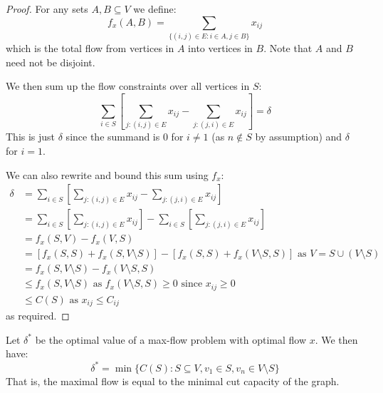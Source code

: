 \documentclass[../main.tex]{subfiles}
\begin{document}
\begin{proof}
  For any sets $A, B \subseteq V$ we define:
  \[
    f_x(A, B) = \sum_{\{(i, j) \in E: i \in A, j \in B\}} x_{i j}
  \]
  which is the total flow from vertices in $A$ into vertices in $B$.
  Note that $A$ and $B$ need not be disjoint.

  We then sum up the flow constraints over all vertices in $S$:
  \[
    \sum_{i \in S} \left[\sum_{j: (i, j) \in E} x_{i j} - \sum_{j: (j, i) \in E} x_{i j}\right] = \delta
  \]
  This is just $\delta$ since the summand is 0 for $i \neq 1$ (as $n \notin S$ by assumption) and $\delta$ for $i = 1$.

  We can also rewrite and bound this sum using $f_x$:
  \begin{align*}
    \delta &= \sum_{i \in S} \left[\sum_{j: (i, j) \in E} x_{i j} - \sum_{j: (j, i) \in E} x_{i j}\right] \\
           &= \sum_{i \in S} \left[\sum_{j: (i, j) \in E} x_{i j}\right] - \sum_{i \in S} \left[\sum_{j: (j, i) \in E} x_{i j}\right] \\
           &= f_x(S, V) - f_x(V, S) \\
           &= [f_x(S, S) + f_x(S, V \setminus S)] - [f_x(S, S) + f_x(V\setminus S, S)] \text{ as $V = S \cup (V \setminus S)$} \\
           &= f_x(S, V \setminus S) - f_x(V \setminus S, S) \\
           &\leq f_x(S, V \setminus S) \text{ as $f_x(V\setminus S, S) \geq 0$ since $x_{i j} \geq 0$}\\
           &\leq C(S) \text{ as $x_{i j} \leq C_{i j}$}
  \end{align*}
  as required.
\end{proof}
\begin{theorem}
  Let $\delta^{*}$ be the optimal value of a max-flow problem with optimal flow $x$.
  We then have: \label{maxmin}
  \[
    \delta^{*} = \min\{C(S): S \subseteq V, v_1 \in S, v_n \in V \setminus S\}
  \]
  That is, the maximal flow is equal to the minimal cut capacity of the graph.
\end{theorem}
\end{document}
